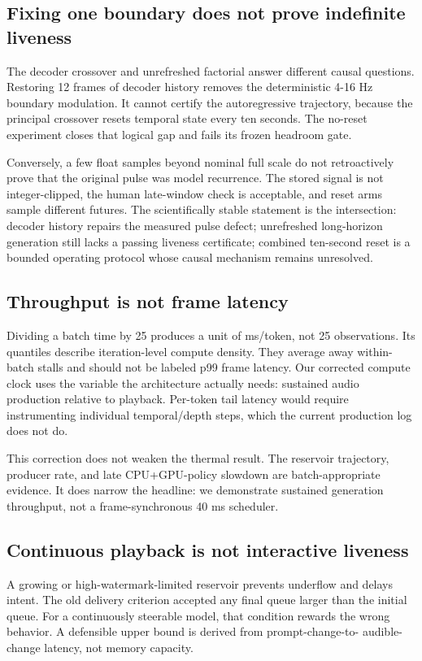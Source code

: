 \documentclass[10pt]{article}
\begin{document}
\subsection{Fixing one boundary does not prove indefinite liveness}
The decoder crossover and unrefreshed factorial answer different causal questions. Restoring 12 frames of decoder history removes the deterministic 4-16 Hz boundary modulation. It cannot certify the autoregressive trajectory, because the principal crossover resets temporal state every ten seconds. The no-reset experiment closes that logical gap and fails its frozen headroom gate.

Conversely, a few float samples beyond nominal full scale do not retroactively prove that the original pulse was model recurrence. The stored signal is not integer-clipped, the human late-window check is acceptable, and reset arms sample different futures. The scientifically stable statement is the intersection: decoder history repairs the measured pulse defect; unrefreshed long-horizon generation still lacks a passing liveness certificate; combined ten-second reset is a bounded operating protocol whose causal mechanism remains unresolved.

\subsection{Throughput is not frame latency}
Dividing a batch time by 25 produces a unit of ms/token, not 25 observations. Its quantiles describe iteration-level compute density. They average away within-batch stalls and should not be labeled p99 frame latency. Our corrected compute clock uses the variable the architecture actually needs: sustained audio production relative to playback. Per-token tail latency would require instrumenting individual temporal/depth steps, which the current production log does not do.

This correction does not weaken the thermal result. The reservoir trajectory, producer rate, and late CPU+GPU-policy slowdown are batch-appropriate evidence. It does narrow the headline: we demonstrate sustained generation throughput, not a frame-synchronous 40 ms scheduler.

\subsection{Continuous playback is not interactive liveness}
A growing or high-watermark-limited reservoir prevents underflow and delays intent. The old delivery criterion accepted any final queue larger than the initial queue. For a continuously steerable model, that condition rewards the wrong behavior. A defensible upper bound is derived from prompt-change-to- audible-change latency, not memory capacity.
\end{document}
